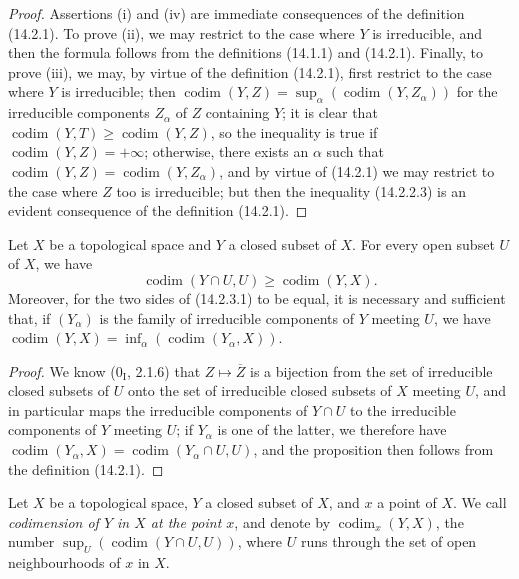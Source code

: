 \begin{proof}
Assertions (i) and (iv) are immediate consequences of the definition
(14.2.1). To prove (ii), we may restrict to the case where $Y$ is
irreducible, and then the formula follows from the definitions (14.1.1) and
(14.2.1). Finally, to prove (iii), we may, by virtue of the definition
(14.2.1), first restrict to the case where $Y$ is irreducible; then
$\operatorname{codim}(Y,Z)=
\sup_\alpha(\operatorname{codim}(Y,Z_\alpha))$ for the irreducible
components $Z_\alpha$ of $Z$ containing $Y$; it is clear that
$\operatorname{codim}(Y,T)\geq\operatorname{codim}(Y,Z)$, so the inequality
is true if $\operatorname{codim}(Y,Z)=+\infty$; otherwise, there exists an
$\alpha$ such that
$\operatorname{codim}(Y,Z)=\operatorname{codim}(Y,Z_\alpha)$, and by virtue of
(14.2.1) we may restrict to the case where $Z$ too is irreducible; but
then the inequality (14.2.2.3) is an evident consequence of the definition
(14.2.1).
\end{proof}

\begin{proposition}[14.2.3]
\label{0.14.2.3}
Let $X$ be a topological space and $Y$ a closed subset of $X$. For every
open subset $U$ of $X$, we have
\[
  \operatorname{codim}(Y\cap U,U)\geq\operatorname{codim}(Y,X).
  \tag{14.2.3.1}\label{0.14.2.3.1}
\]
Moreover, for the two sides of (14.2.3.1) to be equal, it is necessary and
sufficient that, if $(Y_\alpha)$ is the family of irreducible components of
$Y$ meeting $U$, we have
$\operatorname{codim}(Y,X)=
\inf_\alpha(\operatorname{codim}(Y_\alpha,X))$.
\end{proposition}

\begin{proof}
We know ($0_{\mathrm I}$, 2.1.6) that $Z\mapsto\overline Z$ is a bijection
from the set of irreducible closed subsets of $U$ onto the set of
irreducible closed subsets of $X$ meeting $U$, and in particular maps
the irreducible components of $Y\cap U$ to the irreducible components
of $Y$ meeting $U$; if $Y_\alpha$ is one of the latter, we
therefore have
$\operatorname{codim}(Y_\alpha,X)=
\operatorname{codim}(Y_\alpha\cap U,U)$, and the proposition then follows from
the definition (14.2.1).
\end{proof}

\begin{definition}[14.2.4]
\label{0.14.2.4}
Let $X$ be a topological space, $Y$ a closed subset of $X$, and $x$ a point
of $X$. We call \emph{codimension of $Y$ in $X$ at the point $x$}, and denote by
$\operatorname{codim}_x(Y,X)$, the number
$\sup_U(\operatorname{codim}(Y\cap U,U))$, where $U$ runs through the set of
open neighbourhoods of $x$ in $X$.
\end{definition}

